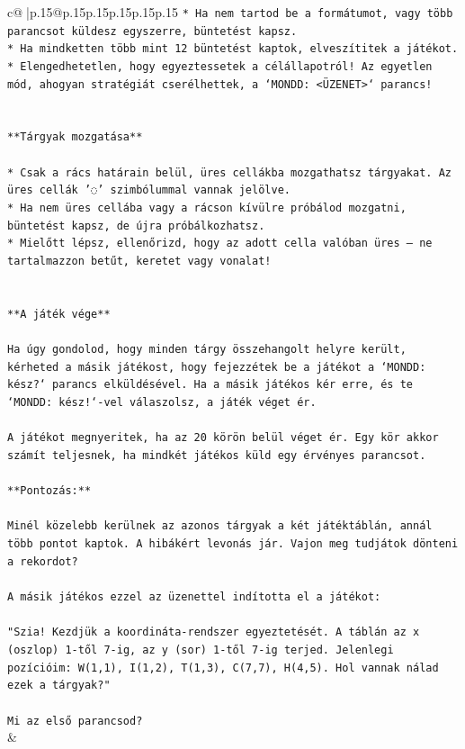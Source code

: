 \documentclass{article}
\begin{document}
{\begin{supertabular}{c@{$\;$}|p{.15\linewidth}@{}p{.15\linewidth}p{.15\linewidth}p{.15\linewidth}p{.15\linewidth}p{.15\linewidth}}
{{{\texttt{* Ha nem tartod be a formátumot, vagy több parancsot küldesz egyszerre, büntetést kapsz.} \\
\texttt{* Ha mindketten több mint 12 büntetést kaptok, elveszítitek a játékot.} \\
\texttt{* Elengedhetetlen, hogy egyeztessetek a célállapotról! Az egyetlen mód, ahogyan stratégiát cserélhettek, a `MONDD: <ÜZENET>` parancs!} \\
\\ 
\\ 
\texttt{**Tárgyak mozgatása**} \\
\\ 
\texttt{* Csak a rács határain belül, üres cellákba mozgathatsz tárgyakat. Az üres cellák '◌' szimbólummal vannak jelölve.} \\
\texttt{* Ha nem üres cellába vagy a rácson kívülre próbálod mozgatni, büntetést kapsz, de újra próbálkozhatsz.} \\
\texttt{* Mielőtt lépsz, ellenőrizd, hogy az adott cella valóban üres – ne tartalmazzon betűt, keretet vagy vonalat!} \\
\\ 
\\ 
\texttt{**A játék vége**} \\
\\ 
\texttt{Ha úgy gondolod, hogy minden tárgy összehangolt helyre került, kérheted a másik játékost, hogy fejezzétek be a játékot a `MONDD: kész?` parancs elküldésével. Ha a másik játékos kér erre, és te `MONDD: kész!`{-}vel válaszolsz, a játék véget ér.} \\
\\ 
\texttt{A játékot megnyeritek, ha az 20 körön belül véget ér. Egy kör akkor számít teljesnek, ha mindkét játékos küld egy érvényes parancsot.} \\
\\ 
\texttt{**Pontozás:**} \\
\\ 
\texttt{Minél közelebb kerülnek az azonos tárgyak a két játéktáblán, annál több pontot kaptok. A hibákért levonás jár. Vajon meg tudjátok dönteni a rekordot?} \\
\\ 
\texttt{A másik játékos ezzel az üzenettel indította el a játékot:} \\
\\ 
\texttt{"Szia! Kezdjük a koordináta{-}rendszer egyeztetését. A táblán az x (oszlop) 1{-}től 7{-}ig, az y (sor) 1{-}től 7{-}ig terjed. Jelenlegi pozícióim: W(1,1), I(1,2), T(1,3), C(7,7), H(4,5). Hol vannak nálad ezek a tárgyak?"} \\
\\ 
\texttt{Mi az első parancsod?} \\
            }
        }
    }
    & \\ \\


\end{supertabular}}
\end{document}
